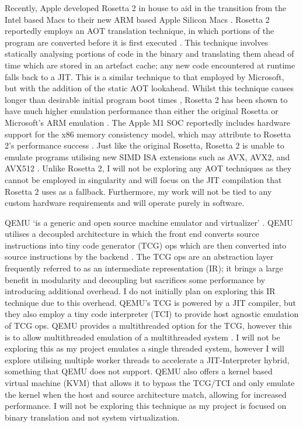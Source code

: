 Recently, Apple developed Rosetta 2 \cite{rosetta2} in house to aid in the transition from the Intel based Macs to their new ARM based Apple Silicon Macs \cite{rosetta2, apple-silicon}. Rosetta 2 reportedly employs an AOT translation technique, in which portions of the program are converted before it is first executed \cite{rosetta2-aot, ars-technica-big-sur}. This technique involves statically analysing portions of code in the binary and translating them ahead of time which are stored in an artefact cache; any new code encountered at runtime falls back to a JIT. This is a similar technique to that employed by Microsoft, but with the addition of the static AOT lookahead. Whilst this technique causes longer than desirable initial program boot times \cite{rosetta2-slow-launch}, Rosetta 2 has been shown to have much higher emulation performance than either the original Rosetta or Microsoft's ARM emulation \cite{rosetta2-perf}. The Apple M1 SOC reportedly includes hardware support for the x86 memory consistency model, which may attribute to Rosetta 2's performance success \cite{rosetta2-infoq}. Just like the original Rosetta, Rosetta 2 is unable to emulate programs utilising new SIMD ISA extensions such as AVX, AVX2, and AVX512 \cite{rosetta2}. Unlike Rosetta 2, I will not be exploring any AOT techniques as they cannot be employed in singularity and will focus on the JIT compilation that Rosetta 2 uses as a fallback. Furthermore, my work will not be tied to any custom hardware requirements and will operate purely in software.

QEMU `is a generic and open source machine emulator and virtualizer' \cite{qemu}. QEMU utilises a decoupled architecture in which the front end converts source instructions into tiny code generator (TCG) ops which are then converted into source instructions by the backend \cite{qemu-tcg}. The TCG ops are an abstraction layer frequently referred to as an intermediate representation (IR); it brings a large benefit in modularity and decoupling but sacrifices some performance by introducing additional overhead. I do not initially plan on exploring this IR technique due to this overhead. QEMU's TCG is powered by a JIT compiler, but they also employ a tiny code interpreter (TCI) to provide host agnostic emulation of TCG ops. QEMU provides a multithreaded option for the TCG, however this is to allow multithreaded emulation of a multithreaded system \cite{qemu-tcg-multithreading}. I will not be exploring this as my project emulates a single threaded system, however I will explore utilising multiple worker threads to accelerate a JIT-Interpreter hybrid, something that QEMU does not support. QEMU also offers a kernel based virtual machine (KVM) that allows it to bypass the TCG/TCI and only emulate the kernel when the host and source architecture match, allowing for increased performance. I will not be exploring this technique as my project is focused on binary translation and not system virtualization.